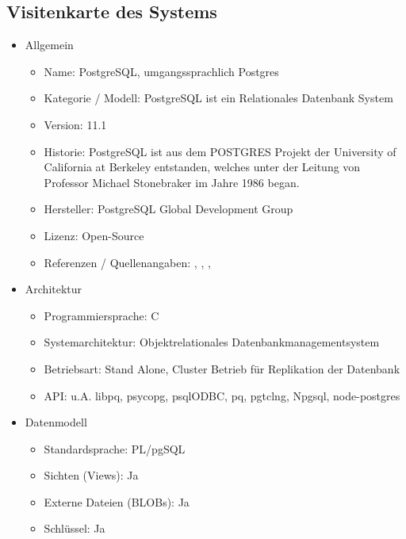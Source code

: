 \subsection{Visitenkarte des Systems}
\begin{itemize}
    \item Allgemein
    \begin{itemize}
        \item Name: PostgreSQL, umgangssprachlich Postgres
        \item Kategorie / Modell: PostgreSQL ist ein Relationales Datenbank System
        \item Version: 11.1
        \item Historie: PostgreSQL ist aus dem POSTGRES Projekt der University of California at Berkeley entstanden, welches unter der Leitung von  Professor Michael Stonebraker im Jahre 1986 began.
        \item Hersteller: PostgreSQL Global Development Group
        \item Lizenz: Open-Source
        \item Referenzen / Quellenangaben: \cite{froehlich01}, \cite{postgres2018}, \cite{postgresqldoc}, \cite{eisentraut01}
    \end{itemize}
    \item Architektur
    \begin{itemize}
        \item Programmiersprache: C
        \item Systemarchitektur: Objektrelationales Datenbankmanagementsystem
        \item Betriebsart: Stand Alone, Cluster Betrieb für Replikation der Datenbank
        \item \ac{API}: u.A. libpq, psycopg, psqlODBC, pq, pgtclng, Npgsql, node-postgres
    \end{itemize}
    \newpage
    \item Datenmodell
    \begin{itemize}
        \item Standardsprache: PL/pgSQL %
        \item Sichten (Views): Ja
        \item Externe Dateien (BLOBs): Ja
        \item Schlüssel: Ja

\end{itemize}
\end{itemize}
